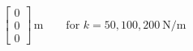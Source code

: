 \documentclass{article}
\begin{document}
\pagestyle{empty}
\[
\begin{bmatrix}0\\0\\0\end{bmatrix}\,\mathrm{m}
\qquad\text{for } k=50,100,200\ \mathrm{N/m}
\]
\end{document}
